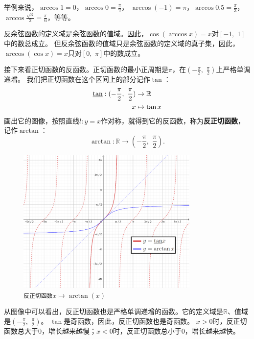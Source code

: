 \documentclass[12pt,UTF8]{ctexbook}
\begin{document}
举例来说，$\arccos{1} = 0$，$\arccos{0} = \frac{\pi}{2}$，
$\arccos{(-1)} = \pi$，$\arccos{0.5} = \frac{\pi}{3}$，$\arccos{\frac{\sqrt{3}}{2}} = \frac{\pi}{6}$，等等。

反余弦函数的定义域是余弦函数的值域。因此，$\cos{(\arccos{x})} = x$对$[-1,\,\, 1]$中的数总成立。
但反余弦函数的值域只是余弦函数的定义域的真子集，因此，$\arccos{(\cos{x})} = x$只对$[0,\,\,\pi]$中的数成立。

接下来看正切函数的反函数。正切函数的最小正周期是$\pi$，在$(-\frac{\pi}{2}, \,\, \frac{\pi}{2})$上严格单调递增。
我们把正切函数在这个区间上的部分记作$\underline{\tan}$：
\begin{align}
    \underline{\tan} : (-\frac{\pi}{2}, \,\, \frac{\pi}{2}) &\rightarrow \mathbb{R} \notag \\
                                                          x &\mapsto \tan{x} \notag
\end{align}
画出它的图像，按照直线$l: y = x$作对称，就得到它的反函数，称为\textbf{反正切函数}，记作$\arctan$：
$$ \arctan : \mathbb{R} \rightarrow (-\frac{\pi}{2}, \,\, \frac{\pi}{2}) . $$

\begin{figure}[h] %
    \vspace{4pt}
    \centering
    \includegraphics[width=0.8\textwidth]{反正切函数1.png}
    \caption*{\texttt{反正切函数}$x\mapsto \arctan(x)$}
\end{figure}

从图像中可以看出，反正切函数也是严格单调递增的函数。它的定义域是$\mathbb{R}$、值域是$(-\frac{\pi}{2}, \,\, \frac{\pi}{2})$。
$\underline{\tan}$是奇函数，因此，反正切函数也是奇函数。
$x > 0$时，反正切函数总大于$0$，增长越来越慢；$x < 0$时，反正切函数总小于$0$，增长越来越快。
\end{document}
